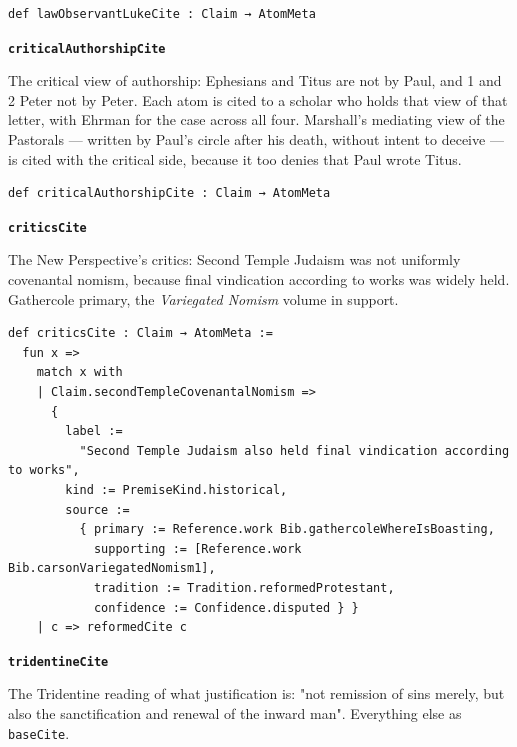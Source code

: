 \documentclass[11pt]{article}
\begin{document}
{\small\begin{verbatim}
def lawObservantLukeCite : Claim → AtomMeta
\end{verbatim}}
\par\medskip\noindent\textbf{\texttt{critical\allowbreak{}Authorship\allowbreak{}Cite}}\par\nobreak\noindent
The critical view of authorship: Ephesians and Titus are not by Paul, and 1 and 2 Peter not by Peter. Each atom is cited to a scholar who holds that view of that letter, with Ehrman for the case across all four. Marshall's mediating view of the Pastorals — written by Paul's circle after his death, without intent to deceive — is cited with the critical side, because it too denies that Paul wrote Titus.

{\small\begin{verbatim}
def criticalAuthorshipCite : Claim → AtomMeta
\end{verbatim}}
\par\medskip\noindent\textbf{\texttt{critics\allowbreak{}Cite}}\par\nobreak\noindent
The New Perspective's critics: Second Temple Judaism was not uniformly covenantal nomism, because final vindication according to works was widely held. Gathercole primary, the \emph{Variegated Nomism} volume in support.

{\small\begin{verbatim}
def criticsCite : Claim → AtomMeta :=
  fun x =>
    match x with
    | Claim.secondTempleCovenantalNomism =>
      {
        label :=
          "Second Temple Judaism also held final vindication according to works",
        kind := PremiseKind.historical,
        source :=
          { primary := Reference.work Bib.gathercoleWhereIsBoasting,
            supporting := [Reference.work Bib.carsonVariegatedNomism1],
            tradition := Tradition.reformedProtestant,
            confidence := Confidence.disputed } }
    | c => reformedCite c
\end{verbatim}}
\par\medskip\noindent\textbf{\texttt{tridentine\allowbreak{}Cite}}\par\nobreak\noindent
The Tridentine reading of what justification is: "not remission of sins merely, but also the sanctification and renewal of the inward man". Everything else as \texttt{base\allowbreak{}Cite}.
\end{document}
